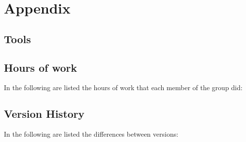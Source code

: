 \documentclass{../Common/Structure/doc_pdf}
\begin{document}
\titleToc


\appendix
\chapter{Appendix}

\section{Tools}
\newpage
\section{Hours of work}
In the following are listed the hours of work that each member of the group did:
\newpage
\section{Version History}
In the following are listed the differences between versions:
\end{document}
